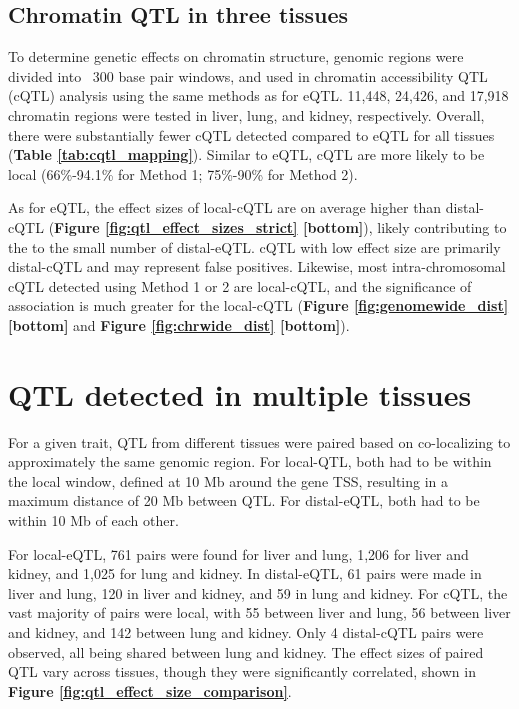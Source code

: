 \subsection{Chromatin QTL in three tissues}

To determine genetic effects on chromatin structure, genomic regions were divided into ~300 base pair windows, and used in chromatin accessibility QTL (cQTL) analysis using the same methods as for eQTL. 11,448, 24,426, and 17,918 chromatin regions were tested in liver, lung, and kidney, respectively. Overall, there were substantially fewer cQTL detected compared to eQTL for all tissues (\textbf{Table \ref{tab:cqtl_mapping}}). Similar to eQTL, cQTL are more likely to be local (66\%-94.1\% for Method 1; 75\%-90\% for Method 2).

As for eQTL, the effect sizes of local-cQTL are on average higher than distal-cQTL (\textbf{Figure \ref{fig:qtl_effect_sizes_strict} [bottom]}), likely contributing to the to the small number of distal-eQTL. cQTL with low effect size are primarily distal-cQTL and may represent false positives. Likewise, most intra-chromosomal cQTL detected using Method 1 or 2 are local-cQTL, and the significance of association is much greater for the local-cQTL  (\textbf{Figure \ref{fig:genomewide_dist} [bottom]} and \textbf{Figure \ref{fig:chrwide_dist} [bottom]}).

\section{QTL detected in multiple tissues}

For a given trait, QTL from different tissues were paired based on co-localizing to approximately the same genomic region. For local-QTL, both had to be within the local window, defined at 10 Mb around the gene TSS, resulting in a maximum distance of 20 Mb between QTL. For distal-eQTL, both had to be within 10 Mb of each other. 

For local-eQTL, 761 pairs were found for liver and lung, 1,206 for liver and kidney, and 1,025 for lung and kidney. In distal-eQTL, 61 pairs were made in liver and lung, 120 in liver and kidney, and 59 in lung and kidney. For cQTL, the vast majority of pairs were local, with 55 between liver and lung, 56 between liver and kidney, and 142 between lung and kidney. Only 4 distal-cQTL pairs were observed, all being shared between lung and kidney. The effect sizes of paired QTL vary across tissues, though they were significantly correlated, shown in \textbf{Figure \ref{fig:qtl_effect_size_comparison}}.

